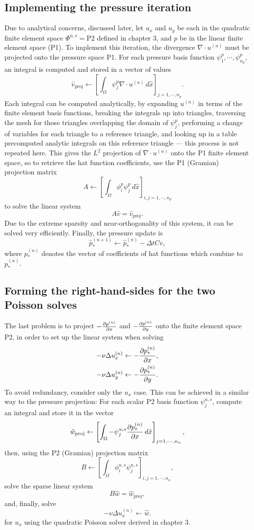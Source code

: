 \subsection{Implementing the pressure iteration}
Due to analytical concerns, discussed later, let $u_x$ and $u_y$ be each in the quadratic finite element space $\Phi^{u,s} = \text{P2}$ defined in chapter 3,
and $p$ be in the linear finite element space (P1).
To implement this iteration, the divergence $\nabla\cdot u^{(n)}$ must be projected onto the pressure space P1.
For each pressure basis function $\psi^p_1,\cdots,\psi^p_{n_p}$, an integral is computed and stored in a vector of values
$$
    \hat{v}_{\text{proj}} \leftarrow \left[\int_\Omega \psi^p_j \nabla\cdot u^{(n)}\,d\hat{x}\right]_{j=1,\cdots,n_p}.
$$
Each integral can be computed analytically, by expanding $u^{(n)}$ in terms of the finite element basis functions,
breaking the integrals up into triangles, traversing the mesh for those triangles overlapping the domain of $\psi^p_j$,
performing a change of variables for each triangle to a reference triangle,
and looking up in a table precomputed analytic integrals on this reference triangle --- this process is not repeated here.
This gives the $L^2$ projection of $\nabla\cdot u^{(n)}$ onto the P1 finite element space, so to retrieve the hat function coefficients,
use the P1 (Gramian) projection matrix
$$
    A \leftarrow \left[ \int_\Omega \phi^p_i\psi^p_j \,d\hat{x}\right]_{i,j=1,\cdots,n_p}
$$
to solve the linear system
$$
    A\hat{v} = \hat{v}_{\text{proj}}.
$$
Due to the extreme sparsity and near-orthogonality of this system, it can be solved very efficiently. Finally,
the pressure update is
$$
    \hat{p}_*^{(n+1)} \leftarrow \hat{p}_*^{(n)} - \Delta t C \hat{v},
$$
where $\hat{p}_*^{(n)}$ denotes the vector of coefficients of hat functions which combine to $p_*^{(n)}$.

\subsection{Forming the right-hand-sides for the two Poisson solves}
The last problem is to project $-\frac{\partial p^{(n)}}{\partial x}$ and $-\frac{\partial p^{(n)}}{\partial y}$ onto the finite element space P2,
in order to set up the linear system when solving
\begin{align*}
    -\nu\Delta u_x^{(n)} &\leftarrow -\frac{\partial p_*^{(n)}}{\partial x},\\
    -\nu\Delta u_y^{(n)} &\leftarrow -\frac{\partial p_*^{(n)}}{\partial y}.
\end{align*}
To avoid redundancy, consider only the $u_x$ case.
This can be achieved in a similar way to the pressure projection: For each scalar P2 basis function $\psi^{u,s}_j$, compute an integral
and store it in the vector
$$
    \hat{w}_{\text{proj}} \leftarrow \left[\int_\Omega -\psi^{u,s}_j \frac{\partial p_*^{(n)}}{\partial x}\,d\hat{x}\right]_{j=1,\cdots,n_u},
$$
then, using the P2 (Gramian) projection matrix
$$
    B \leftarrow \left[ \int_\Omega \phi^{u,s}_i\psi^{u,s}_j \right]_{i,j=1,\cdots,n_u},
$$
solve the sparse linear system
$$
    B\hat{w} = \hat{w}_{\text{proj}},
$$
and, finally, solve
$$
    -\nu\Delta u_x^{(n)} \leftarrow \hat{w}.
$$
for $u_x$ using the quadratic Poisson solver derived in chapter 3.

